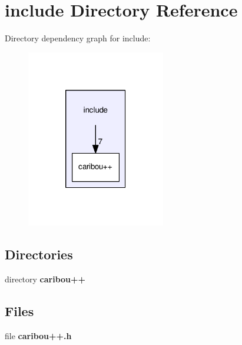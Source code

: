 \section{include Directory Reference}
\label{dir_d44c64559bbebec7f509842c48db8b23}
Directory dependency graph for include\+:
\nopagebreak
\begin{figure}[H]
\begin{center}
\leavevmode
\includegraphics[width=172pt]{dir_d44c64559bbebec7f509842c48db8b23_dep}
\end{center}
\end{figure}
\subsection*{Directories}
\begin{DoxyCompactItemize}
\item 
directory {\bf caribou++}
\end{DoxyCompactItemize}
\subsection*{Files}
\begin{DoxyCompactItemize}
\item 
file {\bf caribou++.\+h}
\end{DoxyCompactItemize}
